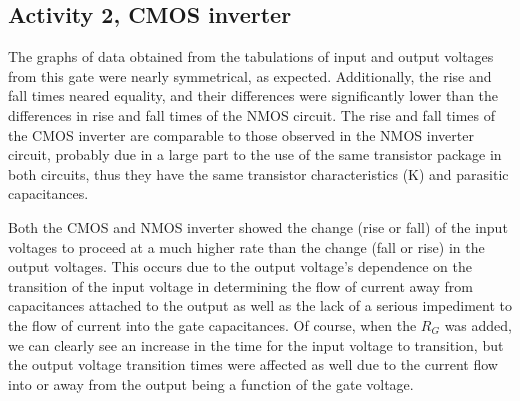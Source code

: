 \documentclass[10pt]{article}
\begin{document}
\subsection{Activity 2, CMOS inverter}

The graphs of data obtained from the tabulations of input and output
voltages from this gate were nearly symmetrical, as expected. Additionally,
the rise and fall times neared equality, and their differences were
significantly lower than the differences in rise and fall times of the
NMOS circuit. The rise and fall times of the CMOS inverter are comparable
to those observed in the NMOS inverter circuit, probably due in a large
part to the use of the same transistor package in both circuits, thus they
have the same transistor characteristics (K) and parasitic capacitances.

Both the CMOS and NMOS inverter showed the change (rise or fall) of the
input voltages to proceed at a much higher rate than the change (fall or
rise) in the output voltages. This occurs due to the output voltage's
dependence on the transition of the input voltage in determining the flow
of current away from capacitances attached to the output as well as the
lack of a serious impediment to the flow of current into the gate
capacitances. Of course, when the $R_G$ was added, we can clearly see an
increase in the time for the input voltage to transition, but the output
voltage transition times were affected as well due to the current flow
into or away from the output being a function of the gate voltage.



%
\end{document}
